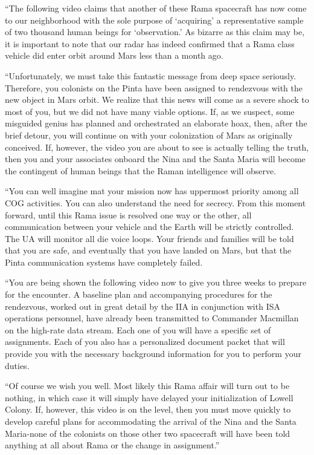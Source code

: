 \documentclass[]{article}
\begin{document}
{“The following video claims that another of these Rama spacecraft has now come to our neighborhood with the sole purpose of ‘acquiring’ a representative sample of two thousand human beings for ‘observation.’ As bizarre as this claim may be, it is important to note that our radar has indeed confirmed that a Rama class vehicle did enter orbit around Mars less than a month ago.

“Unfortunately, we must take this fantastic message from deep space seriously. Therefore, you colonists on the Pinta have been assigned to rendezvous with the new object in Mars orbit. We realize that this news will come as a severe shock to most of you, but we did not have many viable options. If, as we suspect, some misguided genius has planned and orchestrated an elaborate hoax, then, after the brief detour, you will continue on with your colonization of Mars as originally conceived. If, however, the video you are about to see is actually telling the truth, then you and your associates onboard the Nina and the Santa Maria will become the contingent of human beings that the Raman intelligence will observe.

“You can well imagine mat your mission now has uppermost priority among all COG activities. You can also understand the need for secrecy. From this moment forward, until this Rama issue is resolved one way or the other, all communication between your vehicle and the Earth will be strictly controlled. The UA will monitor all die voice loops. Your friends and families will be told that you are safe, and eventually that you have landed on Mars, but that the Pinta communication systems have completely failed.

“You are being shown the following video now to give you three weeks to prepare for the encounter. A baseline plan and accompanying procedures for the rendezvous, worked out in great detail by the IIA in conjunction with ISA operations personnel, have already been transmitted to Commander Macmillan on the high-rate data stream. Each one of you will have a specific set of assignments. Each of you also has a personalized document packet that will provide you with the necessary background information for you to perform your duties.

“Of course we wish you well. Most likely this Rama affair will turn out to be nothing, in which case it will simply have delayed your initialization of Lowell Colony. If, however, this video is on the level, then you must move quickly to develop careful plans for accommodating the arrival of the Nina and the Santa Maria-none of the colonists on those other two spacecraft will have been told anything at all about Rama or the change in assignment.”

}
\end{document}
